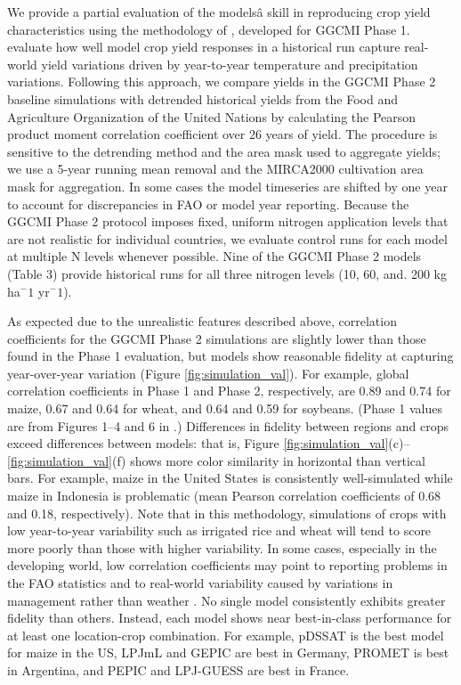 \documentclass[gmd, manuscript]{copernicus} %
\begin{document}
We provide a partial evaluation of the modelsâ skill in reproducing crop yield characteristics using the methodology of \citet{muller_global_2017}, developed for GGCMI Phase 1.
\citet{muller_global_2017} evaluate how well model crop yield responses in a historical run capture real-world yield variations driven by year-to-year temperature and precipitation variations. 
Following this approach, we compare yields in the GGCMI Phase 2 baseline simulations with detrended historical yields from the Food and Agriculture Organization of the United Nations \citep{FAOSTAT} by calculating the Pearson product moment correlation coefficient over 26 years of yield.
The procedure is sensitive to the detrending method and the area mask used to aggregate yields; we use a 5-year running mean removal and the MIRCA2000 cultivation area mask for aggregation. 
In some cases the model timeseries are shifted by one year to account for discrepancies in FAO or model year reporting. 
Because the GGCMI Phase 2 protocol imposes fixed, uniform nitrogen application levels that are not realistic for individual countries, we evaluate control runs for each model at multiple N levels whenever possible. 
Nine of the GGCMI Phase 2 models (Table 3) provide historical runs for all three nitrogen levels (10, 60, and. 200 kg ha$^-1$ yr$^-1$).

As expected due to the unrealistic features described above, correlation coefficients for the GGCMI Phase 2 simulations are slightly lower than those found in the Phase 1 evaluation, but models show reasonable fidelity at capturing year-over-year variation (Figure \ref{fig:simulation_val}). 
For example, global correlation coefficients in Phase 1 and Phase 2, respectively, are 0.89 and 0.74 for maize, 0.67 and 0.64 for wheat, and 0.64 and 0.59 for soybeans.
(Phase 1 values are from Figures 1--4 and 6 in \citet{muller_global_2017}.)  
Differences in fidelity between regions and crops exceed differences between models: that is, Figure \ref{fig:simulation_val}(c)--\ref{fig:simulation_val}(f) shows more color similarity in horizontal than vertical bars. 
For example, maize in the United States is consistently well-simulated while maize in Indonesia is problematic (mean Pearson correlation coefficients of 0.68 and 0.18, respectively). 
Note that in this methodology, simulations of crops with low year-to-year variability such as irrigated rice and wheat will tend to score more poorly than those with higher variability.
In some cases, especially in the developing world, low correlation coefficients may point to reporting problems in the FAO statistics and to real-world variability caused by variations in management rather than weather \citep{Ray2012, muller_global_2017}. 
No single model consistently exhibits greater fidelity than others. 
Instead, each model shows near best-in-class performance for at least one location-crop combination. 
For example, pDSSAT is the best model for maize in the US, LPJmL and GEPIC are best in Germany, PROMET is best in Argentina, and PEPIC and LPJ-GUESS are best in France.
\end{document}
